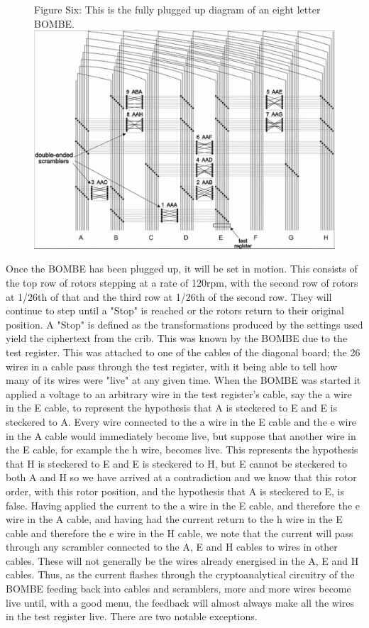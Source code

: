 \documentclass[12pt,a4paper]{article}
\begin{document}
\begin{figure}[H]
\centering
Figure Six: 
This is the fully plugged up diagram of an eight letter BOMBE.
\includegraphics[width=\textwidth]{BOMBEthree.png}
\end{figure}

Once the BOMBE has been plugged up, it will be set in motion. This consists of the top row of rotors stepping at a rate of 120rpm, with the second row of rotors at 1/26th of that and the third row at 1/26th of the second row. They will continue to step until a "Stop" is reached or the rotors return to their original position. A "Stop" is defined as the transformations produced by the settings used yield the ciphertext from the crib. This was known by the BOMBE due to the test register. This was attached to one of the cables of the diagonal board; the 26 wires in a cable pass through the test register, with it being able to tell how many of its wires were "live" at any given time. When the BOMBE was started it applied a voltage to an arbitrary wire in the test register's cable, say the a wire in the E cable, to represent the hypothesis that A is steckered to E and E is steckered to A. Every wire connected to the a wire in the E cable and the e wire in the A cable would immediately become live, but suppose that another wire in the E cable, for example the h wire, becomes live. This represents the hypothesis that H is steckered to E and E is steckered to H, but E cannot be steckered to both A and H so we have arrived at a contradiction and we know that this rotor order, with this rotor position, and the hypothesis that A is steckered to E, is false. Having applied the current to the a wire in the E cable, and therefore the e wire in the A cable, and having had the current return to the h wire in the E cable and therefore the e wire in the H cable, we note that the current will pass through any scrambler connected to the A, E and H cables to wires in other cables. These will not generally be the wires already energised in the A, E and H cables. Thus, as the current flashes through the cryptoanalytical circuitry of the BOMBE feeding back into cables and scramblers, more and more wires become live until, with a good menu, the feedback will almost always make all the wires in the test register live. There are two notable exceptions.
\end{document}
